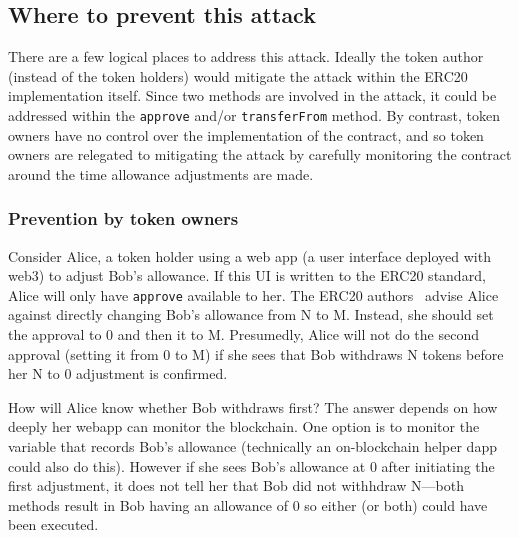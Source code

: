 \subsection{Where to prevent this attack}

There are a few logical places to address this attack. Ideally the token author (instead of the token holders) would mitigate the attack within the ERC20 implementation itself. Since two methods are involved in the attack, it could be addressed within the \texttt{approve} and/or \texttt{transferFrom} method. By contrast, token owners have no control over the implementation of the contract, and so token owners are relegated to mitigating the attack by carefully monitoring the contract around the time allowance adjustments are made.


\subsubsection*{Prevention by token owners}

Consider Alice, a token holder using a web app (\eg a user interface deployed with web3) to adjust Bob's allowance. If this UI is written to the ERC20 standard, Alice will only have \texttt{approve} available to her. The ERC20 authors~\cite{Ref08} advise Alice against directly changing Bob's allowance from N to M. Instead, she should set the approval to 0 and then it to M. Presumedly, Alice will not do the second approval (setting it from 0 to M) if she sees that Bob withdraws N tokens before her N to 0 adjustment is confirmed. 

How will Alice know whether Bob withdraws first? The answer depends on how deeply her webapp can monitor the blockchain. One option is to monitor the variable that records Bob's allowance (technically an on-blockchain helper dapp could also do this). However if she sees Bob's allowance at 0 after initiating the first adjustment, it does not tell her that Bob did not withhdraw N---both methods result in Bob having an allowance of 0 so either (or both) could have been executed.

